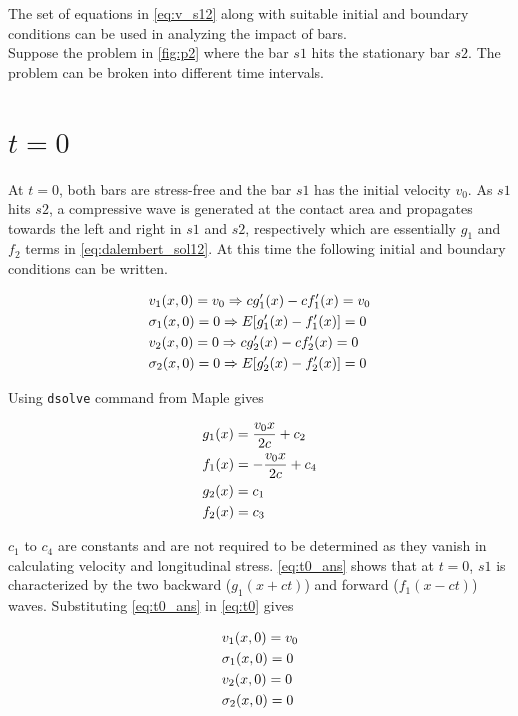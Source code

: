 \documentclass{article}
\begin{document}
The set of equations in \cref{eq:v_s12} along with suitable initial and boundary conditions can be used in analyzing the impact of bars. \\

Suppose the problem in \cref{fig:p2} where the bar $s1$ hits the stationary bar $s2$. The problem can be broken into different time intervals.

\section{$t = 0$}
At $t = 0$, both bars are stress-free and the bar $s1$ has the initial velocity $v_0$. As $s1$ hits $s2$, a compressive wave is generated at the contact area and propagates towards the left and right in $s1$ and $s2$, respectively which are essentially $g_1$ and $f_2$ terms in \cref{eq:dalembert_sol12}. At this time the following initial and boundary conditions can be written.

\begin{align}
    & v_1(x, 0) = v_0 \Rightarrow c g_1'(x) - c f_1'(x) = v_0 \notag\\
    & \sigma_1(x, 0) = 0 \Rightarrow E [g_1'(x) - f_1'(x)] = 0 \notag\\
    & v_2(x, 0) = 0 \Rightarrow c g_2'(x) - c f_2'(x) = 0 \notag\\
    & \sigma_2(x, 0) = 0 \Rightarrow E [g_2'(x) - f_2'(x)] = 0
    \label{eq:t0}
\end{align}

Using \texttt{dsolve} command from Maple gives 

\begin{align}
    & g_1(x) = \frac{v_0 x}{2c} + c_2 \notag\\
    & f_1(x) = -\frac{v_0 x}{2c} + c_4 \notag\\
    & g_2(x) = c_1 \notag\\
    & f_2(x) = c_3
    \label{eq:t0_ans}
\end{align}

$c_1$ to $c_4$ are constants and are not required to be determined as they vanish in calculating velocity and longitudinal stress. \cref{eq:t0_ans} shows that at $t = 0$, $s1$ is characterized by the two backward ($g_1(x + ct)$) and forward ($f_1(x - ct)$) waves. Substituting \cref{eq:t0_ans} in \cref{eq:t0} gives

\begin{align}
    & v_1(x, 0) = v_0 \notag\\
    & \sigma_1(x, 0) = 0 \notag\\
    & v_2(x, 0) = 0 \notag\\
    & \sigma_2(x, 0) = 0 
    \label{eq:t0_result}
\end{align}
\end{document}
